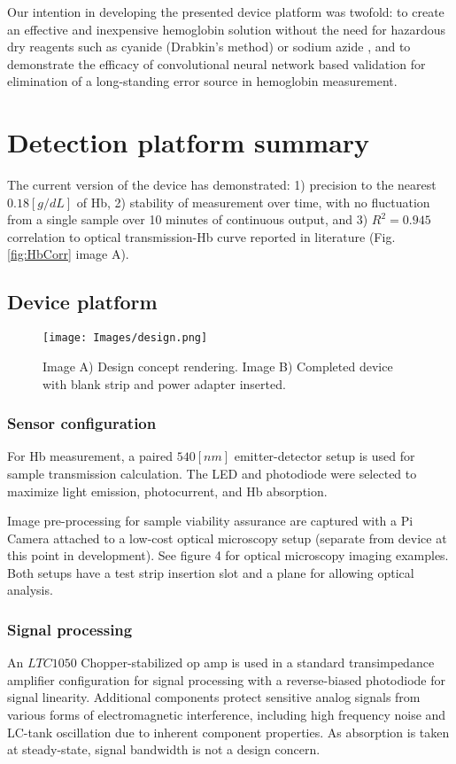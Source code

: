 \documentclass{article}
\begin{document}
Our intention in developing the presented device platform was twofold: to create an effective and inexpensive hemoglobin solution without the need for hazardous dry reagents such as cyanide (Drabkin's method) or sodium azide \cite{hemocue}\cite{vanzetti}\cite{azide}, and to demonstrate the efficacy of convolutional neural network based validation for elimination of a long-standing error source in hemoglobin measurement. 

\section{Detection platform summary}

The current version of the device has demonstrated: 1) precision to the nearest $0.18[g/dL]$ of Hb, 2) stability of measurement over time, with no fluctuation from a single sample over 10 minutes of continuous output, and 3) \(R^2 = 0.945\) correlation to optical transmission-Hb curve reported in literature (Fig.\ref{fig:HbCorr} image A).

\subsection{Device platform}

\begin{figure*}[!ht]
\centering
    \texttt{[image: Images/design.png]}
    \caption{Image A) Design concept rendering. Image B) Completed device with blank strip and power adapter inserted.}
    \label{fig:Chassis}
\end{figure*}

\subsubsection{Sensor configuration}
For Hb measurement, a paired $540[nm]$ emitter-detector setup is used for sample transmission calculation. The LED and photodiode were selected to maximize light emission, photocurrent, and Hb absorption.

Image pre-processing for sample viability assurance are captured with a Pi Camera attached to a low-cost optical microscopy setup (separate from device at this point in development). See figure 4 for optical microscopy imaging examples. Both setups have a test strip insertion slot and a plane for allowing optical analysis.  
 
\subsubsection{Signal processing}
An $LTC1050$ Chopper-stabilized op amp is used in a standard transimpedance amplifier configuration for signal processing with a reverse-biased photodiode for signal linearity. Additional components protect sensitive analog signals from various forms of electromagnetic interference, including high frequency noise and LC-tank oscillation due to inherent component properties. As absorption is taken at steady-state, signal bandwidth is not a design concern.
\end{document}
